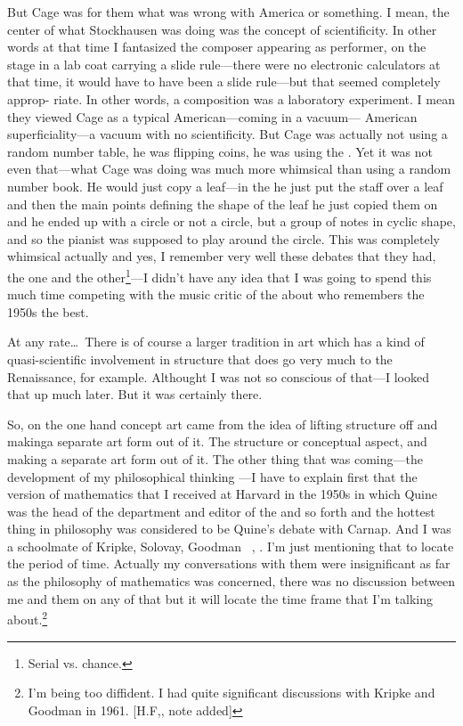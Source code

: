 But Cage was for them what was wrong with America or something. 
I mean, the center of what Stockhausen was doing was the 
concept of scientificity. In other words at that time I fantasized the 
composer appearing as performer, on the stage in a lab coat carrying a 
slide rule---there were no electronic calculators at that time, it would 
have to have been a slide rule---but that seemed completely approp- 
riate. In other words, a composition was a laboratory experiment. I 
mean they viewed Cage as a typical American---coming in a vacuum--- 
American superficiality---a vacuum with no scientificity. But Cage was 
actually not using a random number table, he was flipping coins, he 
was using the . Yet it was not even that---what Cage was doing 
was much more whimsical than using a random number book. He 
would just copy a leaf---in the  he just 
put the staff over a leaf and then the main points defining the shape of 
the leaf he just copied them on and he ended up with a circle or not a 
circle, but a group of notes in cyclic shape, and so the pianist was 
supposed to play around the circle. This was completely whimsical 
actually and yes, I remember very well these debates that they had, the 
one and the other\footnote{Serial vs. chance.}---I didn't have any idea that I was going to spend 
this much time competing with the music critic of the 
about who remembers the 1950s the best. 

At any rate\ldots\  There is of course a larger tradition in art which has 
a kind of quasi-scientific involvement in structure that does go very 
much to the Renaissance, for example. Althought I was not so conscious 
of that---I looked that up much later. But it was certainly there. 

So, on the one hand concept art came from the idea of lifting 
structure off and makinga separate art form out of it. The structure or 
conceptual aspect, and making a separate art form out of it. The other 
thing that was coming---the development of my philosophical thinking 
---I have to explain first that the version of mathematics that I received 
at Harvard in the 1950s in which Quine was the head of the department 
and editor of the  and so forth and the 
hottest thing in philosophy was considered to be Quine's debate with 
Carnap. And I was a schoolmate of Kripke, Solovay, Goodman \etc\ 
\etc, \etc. I'm just mentioning that to locate the period of time. Actually 
my conversations with them were insignificant as far as the philosophy 
of mathematics was concerned, there was no discussion between me 
and them on any of that but it will locate the time frame that I'm talking 
about.\footnote{I'm being too diffident. I had quite significant discussions with Kripke and Goodman in 1961. [H.F,, note added]}

